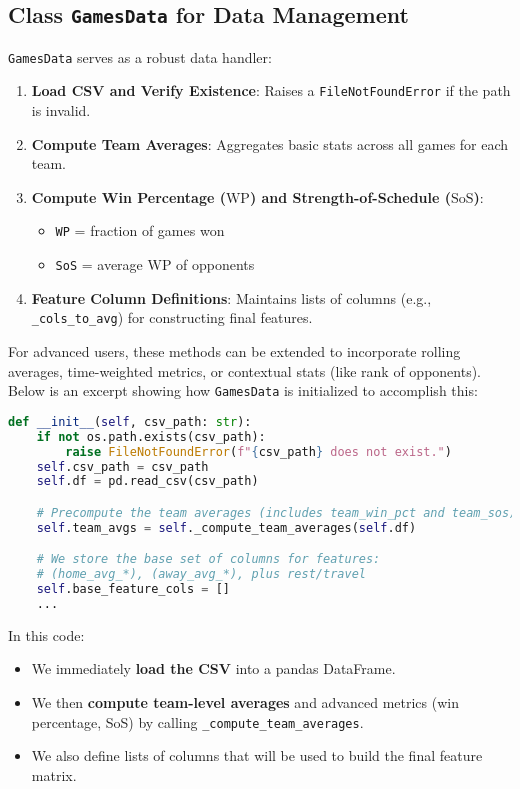 \documentclass[12pt]{article}
\begin{document}
\subsection{Class \texttt{GamesData} for Data Management}
\texttt{GamesData} serves as a robust data handler:
\begin{enumerate}[label=\arabic*)]
    \item \textbf{Load CSV and Verify Existence}: Raises a \texttt{FileNotFoundError} if the path is invalid.
    \item \textbf{Compute Team Averages}: Aggregates basic stats across all games for each team.
    \item \textbf{Compute Win Percentage (\(\text{WP}\)) and Strength-of-Schedule (\(\text{SoS}\))}: 
        \begin{itemize}[noitemsep]
            \item \texttt{WP} = fraction of games won
            \item \texttt{SoS} = average WP of opponents
        \end{itemize}
    \item \textbf{Feature Column Definitions}: Maintains lists of columns (e.g., \texttt{\_cols\_to\_avg}) for constructing final features.
\end{enumerate}

For advanced users, these methods can be extended to incorporate rolling averages, time-weighted metrics, or contextual stats (like rank of opponents). Below is an excerpt showing how \texttt{GamesData} is initialized to accomplish this:

\begin{lstlisting}[language=Python]
def __init__(self, csv_path: str):
    if not os.path.exists(csv_path):
        raise FileNotFoundError(f"{csv_path} does not exist.")
    self.csv_path = csv_path
    self.df = pd.read_csv(csv_path)

    # Precompute the team averages (includes team_win_pct and team_sos)
    self.team_avgs = self._compute_team_averages(self.df)

    # We store the base set of columns for features:
    # (home_avg_*), (away_avg_*), plus rest/travel
    self.base_feature_cols = []
    ...
\end{lstlisting}

\noindent
In this code:
\begin{itemize}
    \item We immediately \textbf{load the CSV} into a pandas DataFrame.
    \item We then \textbf{compute team-level averages} and advanced metrics (win percentage, SoS) by calling \texttt{\_compute\_team\_averages}.
    \item We also define lists of columns that will be used to build the final feature matrix.
\end{itemize}
\end{document}

